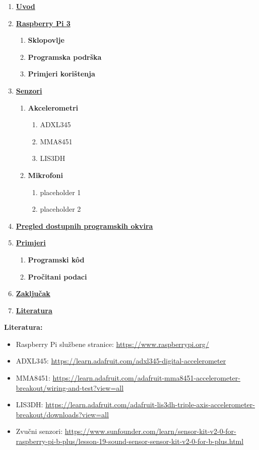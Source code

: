 \documentclass[12pt,a4paper]{article}
\begin{document}
\begin{enumerate}
	\setlength{\itemsep}{1pt}
	\setlength{\parskip}{0pt}
	\setlength{\parsep}{0pt}

	\item \textbf{\underline{Uvod}}
	\item \textbf{\textbf{\underline{Raspberry Pi 3}}}
	\begin{enumerate}
		\item \textbf{Sklopovlje}
		\item \textbf{Programska podrška}
		\item \textbf{Primjeri korištenja}
	\end{enumerate}
	\item \textbf{\underline{Senzori}}
	\begin{enumerate}
		\item \textbf{Akcelerometri}
		\begin{enumerate}
			\item ADXL345
			\item MMA8451
			\item LIS3DH
		\end{enumerate}
		\item \textbf{Mikrofoni}
		\begin{enumerate}
			\item placeholder 1
			\item placeholder 2
		\end{enumerate}
	\end{enumerate}
	\item \textbf{\textbf{\underline{Pregled dostupnih programskih okvira}}}
	\item \textbf{\underline{Primjeri}}
	\begin{enumerate}
		\item \textbf{Programski kôd}
		\item \textbf{Pročitani podaci}
	\end{enumerate}
	\item \textbf{\underline{Zaključak}}
	\item \textbf{\underline{Literatura}} \\
\end{enumerate}

\textbf{Literatura:}
\begin{itemize}
	\item Raspberry Pi službene stranice: \url{https://www.raspberrypi.org/}
	\item ADXL345: \url{https://learn.adafruit.com/adxl345-digital-accelerometer}
	\item MMA8451: \url{https://learn.adafruit.com/adafruit-mma8451-accelerometer-breakout/wiring-and-test?view=all}
	\item LIS3DH: \url{https://learn.adafruit.com/adafruit-lis3dh-triple-axis-accelerometer-breakout/downloads?view=all}
	\item Zvučni senzori: \url{https://www.sunfounder.com/learn/sensor-kit-v2-0-for-raspberry-pi-b-plus/lesson-19-sound-sensor-sensor-kit-v2-0-for-b-plus.html}
\end{itemize}
\end{document}
